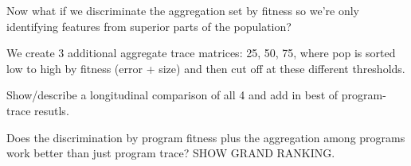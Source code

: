 Now what if we discriminate the aggregation set by fitness so we're only identifying features from superior parts of the population?

We create 3 additional  aggregate trace matrices: 25, 50, 75,  where pop is sorted low to high by fitness (error + size) and then cut off at these different thresholds. 

Show/describe a longitudinal comparison of all 4 and add in best of program-trace resutls.

Does the discrimination by program fitness plus the aggregation among programs work better than just program trace? SHOW GRAND RANKING.


